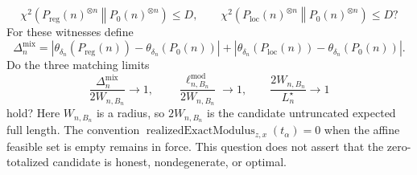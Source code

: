 \[
 \chi^2\!\left(P_{\mathrm{reg}}(n)^{\otimes n}\middle\Vert P_0(n)^{\otimes n}\right)\leq D,
 \qquad
 \chi^2\!\left(P_{\mathrm{loc}}(n)^{\otimes n}\middle\Vert P_0(n)^{\otimes n}\right)\leq D?
\]
For these witnesses define
\[
 \Delta_n^{\mathrm{mix}}
 =\left|\theta_{\delta_n}\!\left(P_{\mathrm{reg}}(n)\right)-
          \theta_{\delta_n}\!\left(P_0(n)\right)\right|
  +\left|\theta_{\delta_n}\!\left(P_{\mathrm{loc}}(n)\right)-
          \theta_{\delta_n}\!\left(P_0(n)\right)\right|.
\]
Do the three matching limits
\[
 \frac{\Delta_n^{\mathrm{mix}}}{2W_{n,B_n}}\longrightarrow1,
 \qquad
 \frac{\ell^{\mathrm{mod}}_{n,B_n}}{2W_{n,B_n}}\longrightarrow1,
 \qquad
 \frac{2W_{n,B_n}}{L_n^\star}\longrightarrow1
\]
hold?  Here \(W_{n,B_n}\) is a radius, so \(2W_{n,B_n}\) is the candidate untruncated expected full length.  The convention \(\operatorname{realizedExactModulus}_{z,x}(t_\alpha)=0\) when the affine feasible set is empty remains in force.  This question does not assert that the zero-totalized candidate is honest, nondegenerate, or optimal.
